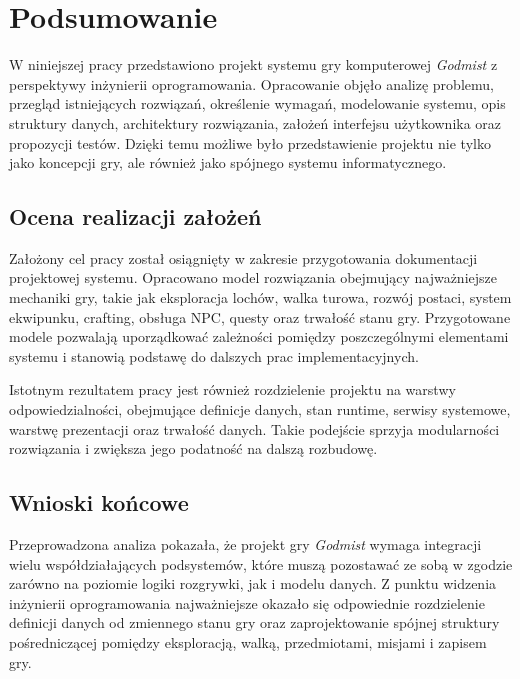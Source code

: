 \chapter{Podsumowanie}
\label{cha:podsumowanie}

W niniejszej pracy przedstawiono projekt systemu gry komputerowej \emph{Godmist} z perspektywy inżynierii oprogramowania. Opracowanie objęło analizę problemu, przegląd istniejących rozwiązań, określenie wymagań, modelowanie systemu, opis struktury danych, architektury rozwiązania, założeń interfejsu użytkownika oraz propozycji testów. Dzięki temu możliwe było przedstawienie projektu nie tylko jako koncepcji gry, ale również jako spójnego systemu informatycznego.

\section{Ocena realizacji założeń}
\label{sec:ocena-realizacji-zalozen}

Założony cel pracy został osiągnięty w zakresie przygotowania dokumentacji projektowej systemu. Opracowano model rozwiązania obejmujący najważniejsze mechaniki gry, takie jak eksploracja lochów, walka turowa, rozwój postaci, system ekwipunku, crafting, obsługa NPC, questy oraz trwałość stanu gry. Przygotowane modele pozwalają uporządkować zależności pomiędzy poszczególnymi elementami systemu i stanowią podstawę do dalszych prac implementacyjnych.

Istotnym rezultatem pracy jest również rozdzielenie projektu na warstwy odpowiedzialności, obejmujące definicje danych, stan runtime, serwisy systemowe, warstwę prezentacji oraz trwałość danych. Takie podejście sprzyja modularności rozwiązania i zwiększa jego podatność na dalszą rozbudowę.

\section{Wnioski końcowe}
\label{sec:wnioski-koncowe}

Przeprowadzona analiza pokazała, że projekt gry \emph{Godmist} wymaga integracji wielu współdziałających podsystemów, które muszą pozostawać ze sobą w zgodzie zarówno na poziomie logiki rozgrywki, jak i modelu danych. Z punktu widzenia inżynierii oprogramowania najważniejsze okazało się odpowiednie rozdzielenie definicji danych od zmiennego stanu gry oraz zaprojektowanie spójnej struktury pośredniczącej pomiędzy eksploracją, walką, przedmiotami, misjami i zapisem gry.

